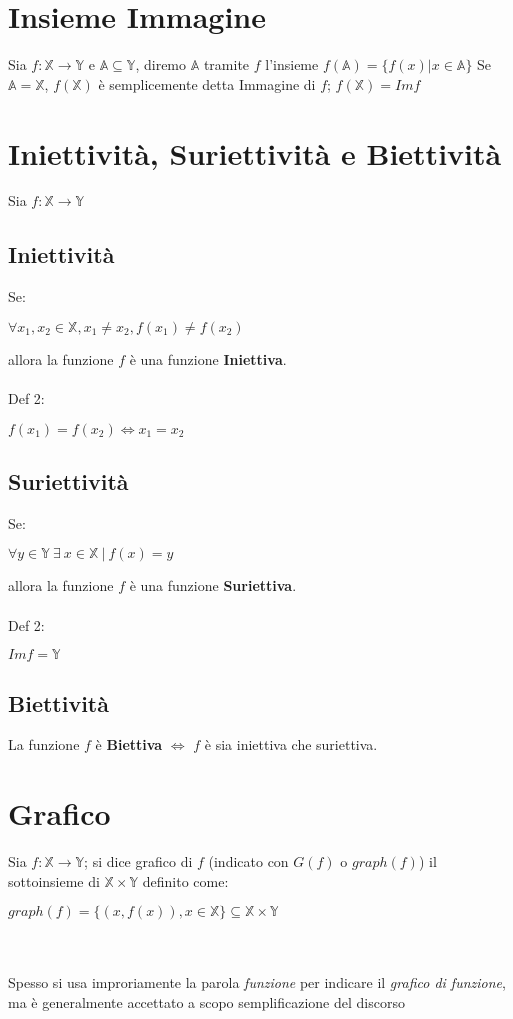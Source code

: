 \section{Insieme Immagine}
Sia $f: \mathbb{X} \rightarrow \mathbb{Y}$ e $\mathbb{A} \subseteq \mathbb{Y}$, diremo $\mathbb{A}$ tramite $f$ l'insieme $f(\mathbb{A}) = \{f(x) | x \in \mathbb{A}\}$
Se $\mathbb{A} = \mathbb{X}$, $f(\mathbb{X})$ è semplicemente detta Immagine di $f$; $f(\mathbb{X}) = Imf$

\section{Iniettività, Suriettività e Biettività}
Sia $f: \mathbb{X} \rightarrow \mathbb{Y}$
\subsection{Iniettività}
Se: \begin{Large}
$\forall x_1,x_2 \in \mathbb{X}, x_1 \neq x_2, f(x_1) \neq f(x_2)$ 
\end{Large} 
allora la funzione $f$ è una funzione \textbf{Iniettiva}.\\
\\
Def 2:\\
\begin{Large}
$f(x_1) = f(x_2) \iff x_1=x_2$ 
\end{Large}

\subsection{Suriettività}
Se: \begin{Large}
$\forall y \in \mathbb{Y}\ \exists\ x \in \mathbb{X}\ |\ f(x) = y$ 
\end{Large} 
allora la funzione $f$ è una funzione \textbf{Suriettiva}.\\
\\
Def 2:\\
\begin{Large}
$Imf = \mathbb{Y}$ 
\end{Large}

\subsection{Biettività}
La funzione $f$ è \textbf{Biettiva} $\iff$ $f$ è sia iniettiva che suriettiva.

\section{Grafico}
Sia $f: \mathbb{X} \rightarrow \mathbb{Y}$; si dice grafico di $f$ (indicato con $G(f)$ o $graph(f)$) il sottoinsieme di $\mathbb{X}\times\mathbb{Y}$ definito come:\\
\begin{Large}
$graph(f)=\{(x,f(x)), x \in \mathbb{X}\} \subseteq \mathbb{X}\times\mathbb{Y}$
\end{Large}\\
\\
Spesso si usa improriamente la parola \textit{funzione} per indicare il \textit{grafico di funzione}, ma è generalmente accettato a scopo semplificazione del discorso


